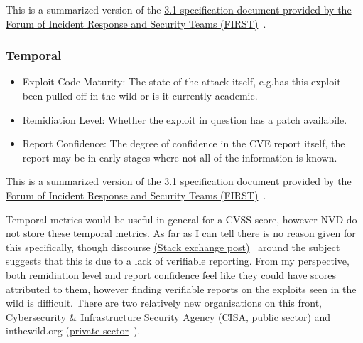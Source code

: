\documentclass[12pt]{article}
\begin{document}
{\footnotesize This is a summarized version of the
\href{https://www.first.org/cvss/v3.1/specification-document}{3.1 specification document
	provided by the  Forum of Incident Response and Security Teams (FIRST)}~\cite{CVSS_31}. } \\

\subsubsection*{Temporal}

\begin{itemize}

	\item Exploit Code Maturity: The state of the attack itself, e.g.\@ has this exploit been pulled
	      off in the wild or is it currently academic.

	\item Remidiation Level: Whether the exploit in question has a patch availabile.

	\item Report Confidence: The degree of confidence in the CVE report itself, the report may be in
	      early stages where not all of the information is known.

\end{itemize}

{\footnotesize This is a summarized version of the
\href{https://www.first.org/cvss/v3.1/specification-document}{3.1 specification document
	provided by the Forum of Incident Response and Security Teams (FIRST)}~\cite{CVSS_31}.}  \\
\bigskip

Temporal metrics would be useful in general for a CVSS score, however NVD do not store these
temporal metrics. As far as I can tell there is no reason given for this specifically, though
discourse
\href{https://security.stackexchange.com/questions/270257/cvss-v3-and-v3-1-missing-temporal-metrics-exploit-code-maturity-and-remediation}{(Stack exchange post)}~\cite{stack_exchange} around the subject suggests that this is due to a lack
of verifiable reporting. From my perspective, both remidiation level and report confidence feel like
they could have scores attributed to them, however finding verifiable reports on the exploits seen
in the wild is difficult. There are two relatively new organisations on this front,
Cybersecurity \& Infrastructure Security Agency (CISA,
\href{https://www.cisa.gov/known-exploited-vulnerabilities-catalog}{public sector}) and
inthewild.org (\href{https://inthewild.io/}{private sector}~\cite{cisa}).
\end{document}
